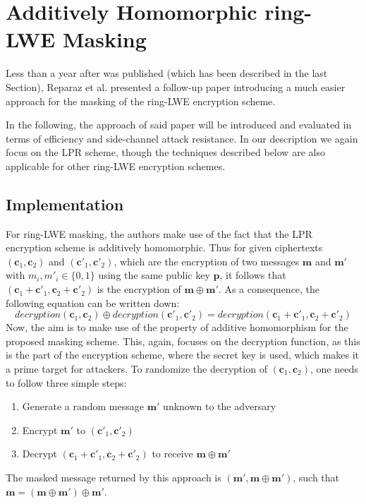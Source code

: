 \chapter{Additively Homomorphic ring-LWE Masking}
Less than a year after\cite{maskedRing} was published (which has been described in the last Section), Reparaz et al. presented a follow-up paper \cite{Reparaz2016} introducing a much easier approach for the masking of the \ac{ring-LWE} encryption scheme.

In the following, the approach of said paper will be introduced and evaluated in terms of efficiency and side-channel attack resistance. In our description we again focus on the \ac{LPR} scheme, though the techniques described below are also applicable for other \ac{ring-LWE} encryption schemes.

\section{Implementation}
For \ac{ring-LWE} masking, the authors make use of the fact that the \ac{LPR} encryption scheme is additively homomorphic. Thus for given ciphertexts \((\textbf{c}_1, \textbf{c}_2)\) and \((\textbf{c}'_1, \textbf{c}'_2)\), which are the encryption of two messages \(\textbf{m}\) and \(\textbf{m}'\) with \(m_i, m'_i \in \{0,1\}\) using the same public key \(\textbf{p}\), it follows that \((\textbf{c}_1+\textbf{c}'_1, \textbf{c}_2+\textbf{c}'_2)\) is the encryption of \(\textbf{m} \oplus \textbf{m}'\). As a consequence, the following equation can be written down:
\begin{equation}
	decryption(\textbf{c}_1,\textbf{c}_2) \oplus decryption(\textbf{c}'_1,\textbf{c}'_2) = decryption(\textbf{c}_1 + \textbf{c}'_1,\textbf{c}_2 + \textbf{c}'_2)
\end{equation}
Now, the aim is to make use of the property of additive homomorphism for the proposed masking scheme. This, again, focuses on the decryption function, as this is the part of the encryption scheme, where the secret key is used, which makes it a prime target for attackers. To randomize the decryption of \((\textbf{c}_1, \textbf{c}_2)\), one needs to follow three simple steps:
\begin{enumerate}
\item Generate a random message \(\textbf{m}'\) unknown to the adversary
\item Encrypt \(\textbf{m}'\) to \((\textbf{c}'_1, \textbf{c}'_2)\)
\item Decrypt \((\textbf{c}_1+\textbf{c}'_1, \textbf{c}_2+\textbf{c}'_2)\) to receive \(\textbf{m} \oplus \textbf{m}'\)
\end{enumerate}
The masked message returned by this approach is \((\textbf{m}', \textbf{m} \oplus \textbf{m}')\), such that \(\textbf{m} = (\textbf{m} \oplus \textbf{m}') \oplus \textbf{m}'\).

